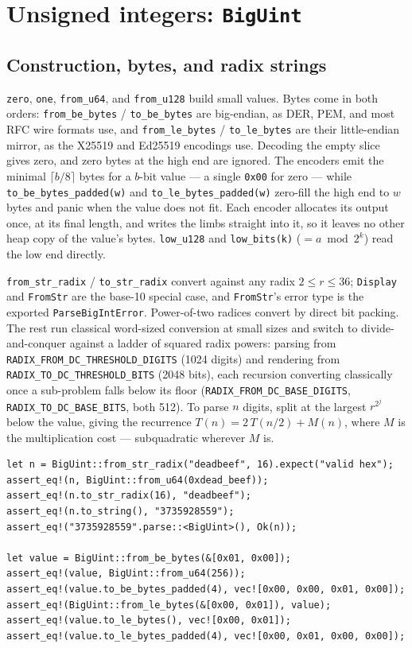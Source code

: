 \documentclass[11pt]{article}
\newcommand{\code}[1]{\texttt{#1}}
\begin{document}
\section{Unsigned integers: \code{BigUint}}

\subsection{Construction, bytes, and radix strings}

\code{zero}, \code{one}, \code{from\_u64}, and \code{from\_u128} build small
values. Bytes come in both orders: \code{from\_be\_bytes} /
\code{to\_be\_bytes} are big-endian, as DER, PEM, and most RFC wire formats
use, and \code{from\_le\_bytes} / \code{to\_le\_bytes} are their
little-endian mirror, as the X25519 and Ed25519 encodings use. Decoding the
empty slice gives zero, and zero bytes at the high end are ignored. The
encoders emit the minimal $\lceil b/8 \rceil$ bytes for a $b$-bit value ---
a single \code{0x00} for zero --- while \code{to\_be\_bytes\_padded(w)} and
\code{to\_le\_bytes\_padded(w)} zero-fill the high end to $w$ bytes and
panic when the value does not fit. Each encoder allocates its output once,
at its final length, and writes the limbs straight into it, so it leaves no
other heap copy of the value's bytes. \code{low\_u128} and
\code{low\_bits(k)} ($= a \bmod 2^k$) read the low end directly.

\code{from\_str\_radix} / \code{to\_str\_radix} convert against any radix
$2 \le r \le 36$; \code{Display} and \code{FromStr} are the base-10 special
case, and \code{FromStr}'s error type is the exported
\code{ParseBigIntError}. Power-of-two radices convert by direct bit packing. The rest run
classical word-sized conversion at small sizes and switch to
divide-and-conquer against a ladder of squared radix powers: parsing from
\code{RADIX\_FROM\_DC\_THRESHOLD\_DIGITS} (1024 digits) and rendering from
\code{RADIX\_TO\_DC\_THRESHOLD\_BITS} (2048 bits), each recursion
converting classically once a sub-problem falls below its floor
(\code{RADIX\_FROM\_DC\_BASE\_DIGITS}, \code{RADIX\_TO\_DC\_BASE\_BITS}, both
512). To parse $n$ digits, split at the largest $r^{2^j}$ below the
value, giving the recurrence $T(n) = 2\,T(n/2) + M(n)$, where $M$ is the
multiplication cost --- subquadratic wherever $M$ is.

\begin{lstlisting}
let n = BigUint::from_str_radix("deadbeef", 16).expect("valid hex");
assert_eq!(n, BigUint::from_u64(0xdead_beef));
assert_eq!(n.to_str_radix(16), "deadbeef");
assert_eq!(n.to_string(), "3735928559");
assert_eq!("3735928559".parse::<BigUint>(), Ok(n));

let value = BigUint::from_be_bytes(&[0x01, 0x00]);
assert_eq!(value, BigUint::from_u64(256));
assert_eq!(value.to_be_bytes_padded(4), vec![0x00, 0x00, 0x01, 0x00]);
assert_eq!(BigUint::from_le_bytes(&[0x00, 0x01]), value);
assert_eq!(value.to_le_bytes(), vec![0x00, 0x01]);
assert_eq!(value.to_le_bytes_padded(4), vec![0x00, 0x01, 0x00, 0x00]);
\end{lstlisting}
\end{document}
